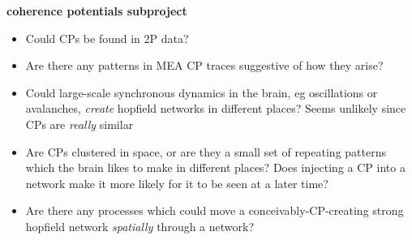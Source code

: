 \documentclass[a4paper, 12pt]{article}
\begin{document}
\textbf{coherence potentials subproject}
\begin{itemize}
\item Could CPs be found in 2P data?
\item Are there any patterns in MEA CP traces suggestive of how they arise?
\item Could large-scale synchronous dynamics in the brain, eg oscillations or avalanches, \textit{create} hopfield networks in different places? Seems unlikely since CPs are \textit{really} similar
\item Are CPs clustered in space, or are they a small set of repeating patterns which the brain likes to make in different places? Does injecting a CP into a network make it more likely for it to be seen at a later time?
\item Are there any processes which could move a conceivably-CP-creating strong hopfield network \textit{spatially} through a network?
\end{itemize}



\end{document}
